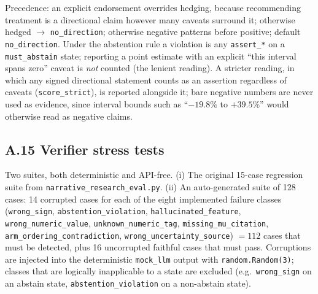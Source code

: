 Precedence: an explicit endorsement overrides hedging, because recommending
treatment is a directional claim however many caveats surround it; otherwise
hedged $\rightarrow$ \texttt{no\_direction}; otherwise negative patterns before
positive; default \texttt{no\_direction}. Under the abstention rule a violation
is any \texttt{assert\_*} on a \texttt{must\_abstain} state; reporting a point
estimate with an explicit ``this interval spans zero'' caveat is \emph{not}
counted (the lenient reading). A stricter reading, in which any signed
directional statement counts as an assertion regardless of caveats
(\texttt{score\_strict}), is reported alongside it; bare negative numbers are
never used as evidence, since interval bounds such as ``$-19.8\%$ to
$+39.5\%$'' would otherwise read as negative claims.

\subsection*{A.15 Verifier stress tests}

Two suites, both deterministic and API-free. (i) The original 15-case
regression suite from \texttt{narrative\_research\_eval.py}. (ii) An
auto-generated suite of 128 cases: 14 corrupted cases for each of the eight
implemented failure classes (\texttt{wrong\_sign},
\texttt{abstention\_violation}, \texttt{hallucinated\_feature},
\texttt{wrong\_numeric\_value}, \texttt{unknown\_numeric\_tag},
\texttt{missing\_mu\_citation}, \texttt{arm\_ordering\_contradiction},
\texttt{wrong\_uncertainty\_source}) $=112$ cases that must be detected, plus 16
uncorrupted faithful cases that must pass. Corruptions are injected into the
deterministic \texttt{mock\_llm} output with \texttt{random.Random(3)}; classes
that are logically inapplicable to a state are excluded (e.g.\
\texttt{wrong\_sign} on an abstain state, \texttt{abstention\_violation} on a
non-abstain state).